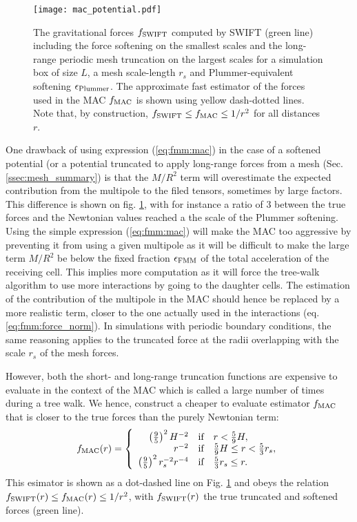 \begin{figure}
\texttt{[image: mac\_potential.pdf]}
\caption{The gravitational forces $f_{\rm SWIFT}$ computed by SWIFT
  (green line) including the force softening on the smallest scales
  and the long-range periodic mesh truncation on the largest scales
  for a simulation box of size $L$, a mesh scale-length $r_s$ and
  Plummer-equivalent softening $\epsilon_{\rm Plummer}$. The
  approximate fast estimator of the forces used in the MAC $f_{\rm
    MAC}$ is shown using yellow dash-dotted lines. Note that, by
  construction, $f_{\rm SWIFT} \leq f_{\rm MAC} \leq 1/r^2$ for all
  distances $r$.}
\label{fig:fmm:mac_potential}
\end{figure}

One drawback of using expression (\ref{eq:fmm:mac}) in the case of a
softened potential (or a potential truncated to apply long-range
forces from a mesh (Sec. \ref{ssec:mesh_summary}) is that the $M/R^2$
term will overestimate the expected contribution from the multipole to
the filed tensors, sometimes by large factors. This difference is
shown on fig. \ref{fig:fmm:mac_potential}, with for instance a ratio
of $3$ between the true forces and the Newtonian values reached a the
scale of the Plummer softening. Using the simple expression
(\ref{eq:fmm:mac}) will make the MAC too aggressive by preventing it
from using a given multipole as it will be difficult to make the large
term $M/R^2$ be below the fixed fraction $\epsilon_{\rm FMM}$ of the
total acceleration of the receiving cell. This implies more
computation as it will force the tree-walk algorithm to use more
interactions by going to the daughter cells. The estimation of the
contribution of the multipole in the MAC should hence be replaced by a
more realistic term, closer to the one actually used in the
interactions (eq. \ref{eq:fmm:force_norm}). In simulations with
periodic boundary conditions, the same reasoning applies to the
truncated force at the radii overlapping with the scale $r_s$ of the
mesh forces.

However, both the short- and long-range truncation functions are
expensive to evaluate in the context of the MAC which is called a
large number of times during a tree walk. We hence, construct a
cheaper to evaluate estimator $f_{\rm MAC}$ that is closer to the true
forces than the purely Newtonian term:
\begin{align}
f_{\rm MAC}(r) =
\left\lbrace\begin{array}{rcl}
  \left(\frac{9}{5}\right)^2 H^{-2} & \mbox{if} & r <
  \frac{5}{9}H,\\
  r^{-2} & \mbox{if} & \frac{5}{9}H \leq r < \frac{5}{3}r_s, \\
  \left(\frac{9}{5}\right)^2 r_s^{-2} r^{-4} & \mbox{if} & \frac{5}{3}r_s \leq r. \\
\end{array}
\right.
\label{eq:fmm:f_mac}
\end{align}
This esimator is shown as a dot-dashed line on
Fig. \ref{fig:fmm:mac_potential} and obeys the relation $f_{\rm SWIFT}(r)
\leq f_{\rm MAC}(r) \leq 1/r^2$, with $f_{\rm SWIFT}(r)$ the true
truncated and softened forces (green line).
